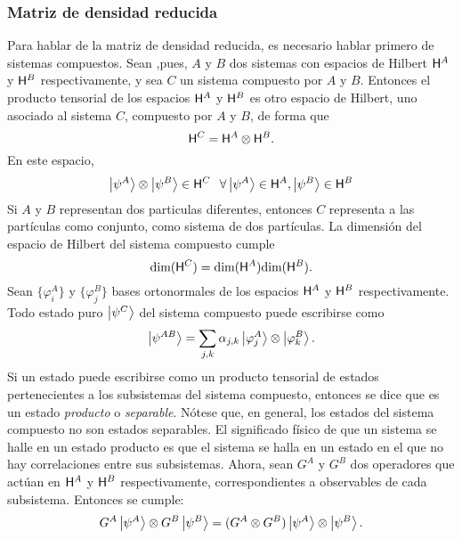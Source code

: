 \subsubsection{Matriz de densidad reducida}\label{sec:PartialTrace}
Para hablar de la matriz de densidad reducida, es necesario hablar primero de sistemas compuestos. Sean ,pues, $A$ y $B$ dos sistemas con espacios de Hilbert ${\sf H}^{A}$ y ${\sf H}^{B}$ respectivamente, y sea $C$ un sistema compuesto por $A$ y $B$. Entonces el producto tensorial de los espacios ${\sf H}^{A}$ y ${\sf H}^{B}$ es otro espacio de Hilbert, uno asociado al sistema $C$, compuesto por $A$ y $B$, de forma que
 \begin{equation*}
     {\sf H}^{C}={\sf H}^{A}\otimes{\sf H}^{B}.
 \end{equation*}
En este espacio,
\begin{equation*}
    \ket{\psi^{A}}\otimes\ket{\psi^{B}}\in{\sf H}^{C}\,\; \; \forall\ket{\psi^{A}}\in{\sf H}^{A},\ket{\psi^{B}}\in{\sf H}^{B}
\end{equation*}
Si $A$ y $B$ representan dos particulas diferentes, entonces $C$ representa a las partículas como conjunto, como sistema de dos partículas. La dimensión del espacio de Hilbert del sistema compuesto cumple
\begin{equation*}
    \text{dim}({\sf H}^{C})=\text{dim}({\sf H}^{A})\text{dim}({\sf H}^{B}).
\end{equation*}
Sean $\{\varphi_{i}^{A}\}$ y $\{\varphi_{j}^{B}\}$ bases ortonormales de los espacios ${\sf H}^{A}$ y ${\sf H}^{B}$ respectivamente. Todo estado puro $\ket{\psi^{C}}$ del sistema compuesto puede escribirse como
\begin{equation*}
    \ket{\psi^{AB}}=\sum_{j,k}\alpha_{j,k}\ket{\varphi_{j}^{A}}\otimes\ket{\varphi_{k}^{B}}.
\end{equation*}
Si un estado puede escribirse como un producto tensorial de estados pertenecientes a los subsistemas del sistema compuesto, entonces se dice que es un estado \textit{producto} o \textit{separable}. Nótese que, en general, los estados del sistema compuesto no son estados separables. El significado físico de que un sistema se halle en un estado producto es que el sistema se halla en un estado en el que no hay correlaciones entre sus subsistemas. Ahora, sean $G^{A}$ y $G^{B}$ dos operadores que actúan en ${\sf H}^{A}$ y ${\sf H}^{B}$ respectivamente, correspondientes a observables de cada subsistema. Entonces se cumple:
\begin{equation*}
    G^{A}\ket{\psi^{A}}\otimes G^{B}\ket{\psi^{B}}=(G^{A}\otimes G^{B})\ket{\psi^{A}}\otimes\ket{\psi^{B}}.
\end{equation*}

